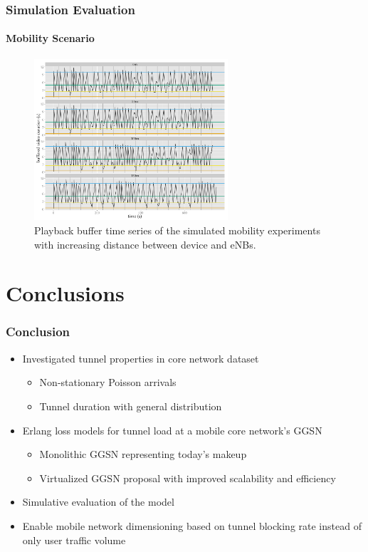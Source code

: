 \documentclass{beamer}
\begin{document}
\begin{frame}
	\frametitle{Simulation Evaluation}
	\framesubtitle{Mobility Scenario}

	\begin{figure}
		\includegraphics[height=6cm]{../../chapters/06-mobilestreamingmeasurements/images/R-ltesim-plotbuffer-mobility-facets.pdf}
		\caption{Playback buffer time series of the simulated mobility experiments with increasing distance between device and eNBs.}
	\end{figure}

\end{frame}


\section{Conclusions}

\begin{frame}
	\frametitle{Conclusion}

	\begin{itemize}
		\item Investigated tunnel properties in core network dataset

		\begin{itemize}
			\item Non-stationary Poisson arrivals
			\item Tunnel duration with general distribution
		\end{itemize}

		\item Erlang loss models for tunnel load at a mobile core network's GGSN
		\begin{itemize}
			\item Monolithic GGSN representing today's makeup
			\item Virtualized GGSN proposal with improved scalability and efficiency
		\end{itemize}

		\item Simulative evaluation of the model

		\item Enable mobile network dimensioning based on tunnel blocking rate instead of only user traffic volume


	\end{itemize}

\end{frame}
\end{document}
